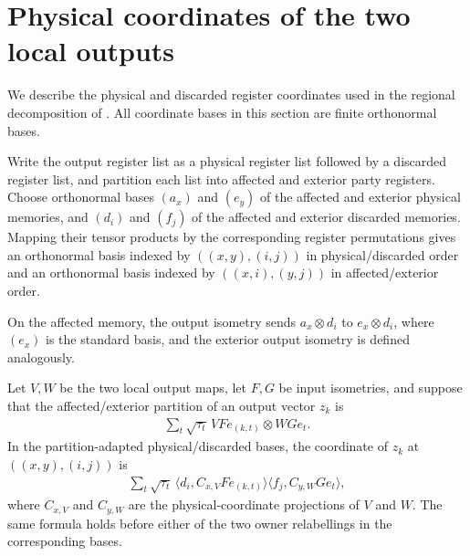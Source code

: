 \section{Physical coordinates of the two local outputs}
\label{sec:peps_local_output_coordinates}

We describe the physical and discarded register coordinates used in the
regional decomposition of \cite[proof of Theorem~5.2]{OpenAI2026PolynomialPEPS}.
All coordinate bases in this section are finite orthonormal bases.

\begin{definition}
    \label{def:peps_partition_output_bases}
    \leanok
    Write the output register list as a physical register list followed by a
    discarded register list, and partition each list into affected and exterior
    party registers. Choose orthonormal bases $(a_x)$ and $(e_y)$ of the
    affected and exterior physical memories, and $(d_i)$ and $(f_j)$ of the
    affected and exterior discarded memories. Mapping their tensor
    products by the corresponding register permutations gives an orthonormal
    basis indexed by $((x,y),(i,j))$ in physical/discarded order and an
    orthonormal basis indexed by $((x,i),(y,j))$ in affected/exterior order.

    On the affected memory, the output isometry sends $a_x\otimes d_i$ to
    $e_x\otimes d_i$, where $(e_x)$ is the standard basis, and the exterior
    output isometry is defined analogously.
\end{definition}

\begin{lemma}
    \label{thm:peps_local_schmidt_output_coordinates}
    \leanok
    Let $V,W$ be the two local output maps, let $F,G$ be input isometries, and
    suppose that the affected/exterior partition of an output vector $z_k$ is
    \begin{align}
        \sum_t\sqrt{\tau_t}\,
        VF e_{(k,t)}\otimes WG e_t.
        \label{eq:peps_local_schmidt_output_vector}
    \end{align}
    In the partition-adapted physical/discarded bases, the coordinate of $z_k$
    at $((x,y),(i,j))$ is
    \begin{align}
        \sum_t\sqrt{\tau_t}\,
        \langle d_i,C_{x,V}F e_{(k,t)}\rangle
        \langle f_j,C_{y,W}G e_t\rangle,
        \label{eq:peps_local_schmidt_output_coordinate}
    \end{align}
    where $C_{x,V}$ and $C_{y,W}$ are the physical-coordinate projections of
    $V$ and $W$. The same formula holds before either of the two owner
    relabellings in the corresponding bases.
\end{lemma}

